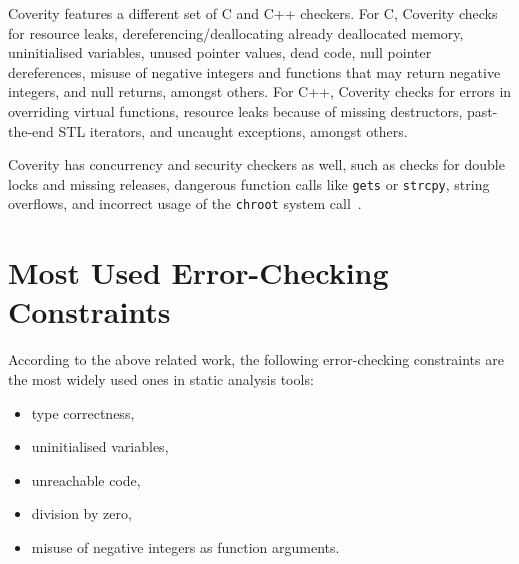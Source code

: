 Coverity features a different set of C and C++ checkers. For C, Coverity checks for resource leaks, dereferencing/deallocating already deallocated memory, uninitialised variables, unused pointer values, dead code, null pointer dereferences, misuse of negative integers and functions that may return negative integers, and null returns, amongst others. For C++, Coverity checks for errors in overriding virtual functions, resource leaks because of missing destructors, past-the-end STL iterators, and uncaught exceptions, amongst others.

Coverity has concurrency and security checkers as well, such as checks for double locks and missing releases, dangerous function calls like \lstinline{gets} or \lstinline{strcpy}, string overflows, and incorrect usage of the \lstinline{chroot} system call~\cite{emanuelsson2008comparative}.


\section{Most Used Error-Checking Constraints}

According to the above related work, the following error-checking constraints are the most widely used ones in static analysis tools:

\begin{itemize}
\item type correctness,
\item uninitialised variables,
\item unreachable code,
\item division by zero,
\item misuse of negative integers as function arguments.
\end{itemize}
